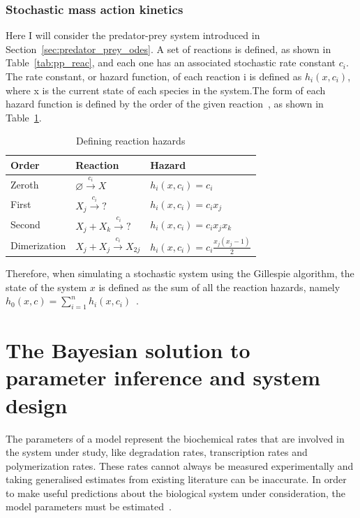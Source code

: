 \subsubsection{Stochastic mass action kinetics}
Here I will consider the predator-prey system introduced in Section~\ref{sec:predator_prey_odes}. A set of reactions is defined, as shown in Table~\ref{tab:pp_reac}, and each one has an associated stochastic rate constant $c_i$. The rate constant, or hazard function, of each reaction i is defined as $h_i(x, c_i)$, where x is the current state of each species in the system.The form of each hazard function is defined by the order of the given reaction~\autocite{Wilkinson:2006td}, as shown in Table~\ref{tab:hazards}. 


\begin{table}[h]
\centering
\caption{Defining reaction hazards}
\label{tab:hazards}
\begin{tabular}{@{}lll@{}}
\toprule
Order & Reaction & Hazard \\ \midrule
Zeroth & $\varnothing \xrightarrow{c_i}X $ & $h_i(x, c_i) = c_i$ \\
First & $X_j \xrightarrow{c_i} ? $ & $h_i(x, c_i) = c_{i}x_j$ \\
Second & $X_j + X_k \xrightarrow{c_i} ? $ & $h_i(x, c_i) = c_{i}x_{j}x_k$ \\
Dimerization & $X_j + X_j \xrightarrow{c_i} X_{2j} $ & $h_i(x, c_i) = c_{i}\frac{x_{j}(x_{j}-1)}{2}$ \\ \bottomrule
\end{tabular}
\end{table}

\noindent Therefore, when simulating a stochastic system using the Gillespie algorithm, the state of the system $x$ is defined as the sum of all the reaction hazards, namely $h_0(x, c) = \sum_{i=1}^{n}h_{i}(x, c_i)$~\autocite{Wilkinson:2006td}. 

\section{The Bayesian solution to parameter inference and system design}

The parameters of a model represent the biochemical rates that are involved in the system under study, like degradation rates, transcription rates and polymerization rates. These rates cannot always be measured experimentally and taking generalised estimates from existing literature can be inaccurate. In order to make useful predictions about the biological system under consideration, the model parameters must be estimated~\autocite{Zheng:2010bp}. 

